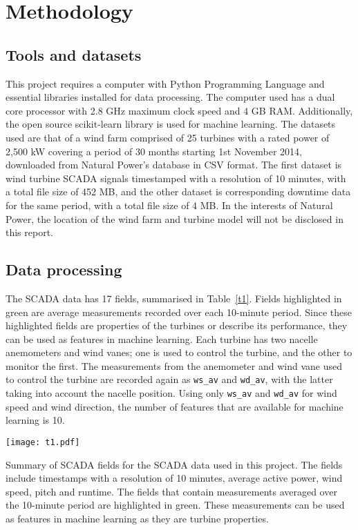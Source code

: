 
\chapter{Methodology}\label{c2}

\section{Tools and datasets}

This project requires a computer with Python Programming Language \cite{Welco} and essential libraries installed for data processing. The computer used has a dual core processor with 2.8 GHz maximum clock speed and 4 GB RAM. Additionally, the open source scikit-learn library \cite{Pedre11} is used for machine learning. The datasets used are that of a wind farm comprised of 25 turbines with a rated power of 2,500 kW covering a period of 30 months starting 1st November 2014, downloaded from Natural Power's database in CSV format. The first dataset is wind turbine SCADA signals timestamped with a resolution of 10 minutes, with a total file size of 452 MB, and the other dataset is corresponding downtime data for the same period, with a total file size of 4 MB. In the interests of Natural Power, the location of the wind farm and turbine model will not be disclosed in this report.

\section{Data processing}

The SCADA data has 17 fields, summarised in Table~\ref{t1}. Fields highlighted in green are average measurements recorded over each 10-minute period. Since these highlighted fields are properties of the turbines or describe its performance, they can be used as features in machine learning. Each turbine has two nacelle anemometers and wind vanes; one is used to control the turbine, and the other to monitor the first. The measurements from the anemometer and wind vane used to control the turbine are recorded again as \texttt{ws\_av} and \texttt{wd\_av}, with the latter taking into account the nacelle position. Using only \texttt{ws\_av} and \texttt{wd\_av} for wind speed and wind direction, the number of features that are available for machine learning is 10.

\begin{table}
    \centering
    \texttt{[image: t1.pdf]}
    \caption{\label{t1}Summary of SCADA fields for the SCADA data used in this project. The fields include timestamps with a resolution of 10 minutes, average active power, wind speed, pitch and runtime. The fields that contain measurements averaged over the 10-minute period are highlighted in green. These measurements can be used as features in machine learning as they are turbine properties.}
\end{table}

